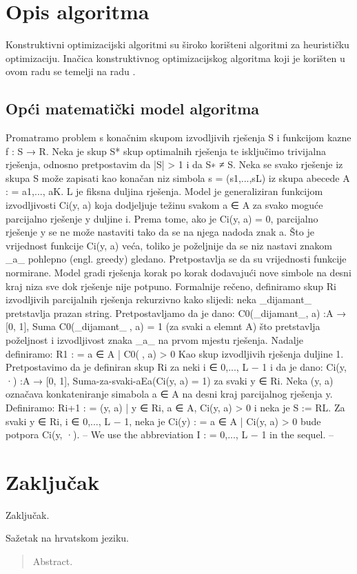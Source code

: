 \documentclass[times, utf8, zavrsni]{fer}
\begin{document}
\chapter{Opis algoritma}
Konstruktivni optimizacijski algoritmi su široko korišteni algoritmi za heurističku optimizaciju. Inačica konstruktivnog optimizacijskog algoritma koji je korišten u ovom radu se temelji na radu \citep{zijun2014asymptotic}.

\section{Opći matematički model algoritma}
Promatramo problem s konačnim skupom izvodljivih rješenja S i funkcijom kazne f : S → R. Neka je skup S* skup optimalnih rješenja te isključimo trivijalna rješenja,
odnosno pretpostavim da |S| > 1 i da S∗ ≠ S. Neka se svako rješenje iz skupa S može zapisati kao konačan niz simbola s = (s1,...,sL) iz skupa abecede A : =
{a1,..., aK}. L je fiksna duljina rješenja. Model je generaliziran funkcijom izvodljivosti Ci(y, a) koja dodjeljuje težinu svakom a ∈ A za svako moguće parcijalno
rješenje y duljine i. Prema tome, ako je Ci(y, a) = 0, parcijalno rješenje y se ne može nastaviti tako da se na njega nadoda znak a. Što je vrijednost funkcije Ci(y, a) veća,
toliko je poželjnije da se niz nastavi znakom _a_ pohlepno (engl. greedy) gledano. Pretpostavlja se da su vrijednosti funkcije normirane. Model gradi rješenja korak po korak
dodavajući nove simbole na desni kraj niza sve dok rješenje nije potpuno. Formalnije rečeno, definiramo skup Ri izvodljivih parcijalnih rješenja rekurzivno kako slijedi:
neka _dijamant_ pretstavlja prazan string. Pretpostavljamo da je dano:
C0(_dijamant_, a) :A → [0, 1], Suma C0(_dijamant_, a) = 1 (za svaki a elemnt A)
što pretstavlja poželjnost i izvodljivost znaka _a_ na prvom mjestu rješenja. Nadalje definiramo:
R1 : = {a ∈ A | C0(, a) > 0}
Kao skup izvodljivih rješenja duljine 1. Pretpostavimo da je definiran skup Ri za neki i  ∈ {0,..., L − 1} i da je dano:
Ci(y, ·) :A → [0, 1], Suma-za-svaki-aEa(Ci(y, a) = 1) za svaki y ∈ Ri.
Neka (y, a) označava konkateniranje simabola a ∈ A na desni kraj parcijalnog rješenja y. Definiramo:
Ri+1 : = { (y, a) | y ∈ Ri, a ∈ A, Ci(y, a) > 0 }
i neka je S := RL. Za svaki y ∈ Ri, i ∈ {0,..., L − 1}, neka je
Ci(y) : = {a ∈ A | Ci(y, a) > 0}
bude potpora Ci(y, ·). -- We use the abbreviation I : = {0,..., L − 1} in the sequel. --

\chapter{Zaključak}
Zaključak.




\begin{sazetak}
Sažetak na hrvatskom jeziku.

\end{sazetak}

\begin{abstract}
Abstract.

\end{abstract}
\end{document}
